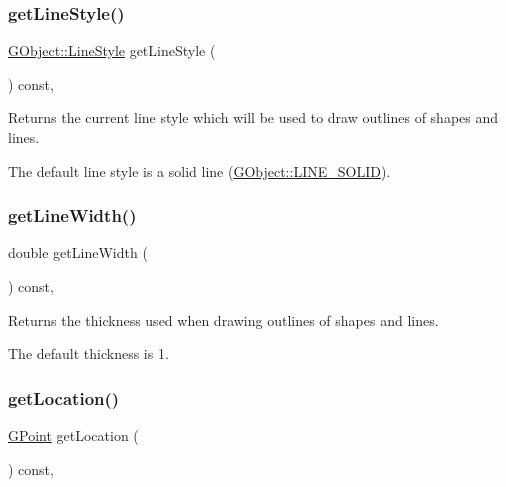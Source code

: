 \subsubsection{\texorpdfstring{get\+Line\+Style()}{getLineStyle()}}
{\footnotesize\ttfamily \mbox{\hyperlink{classGObject_a86e0f5648542856159bb40775c854aa7}{G\+Object\+::\+Line\+Style}} get\+Line\+Style (\begin{DoxyParamCaption}{ }\end{DoxyParamCaption}) const\hspace{0.3cm}{\ttfamily [virtual]}, {\ttfamily [inherited]}}



Returns the current line style which will be used to draw outlines of shapes and lines. 

The default line style is a solid line (\mbox{\hyperlink{classGObject_a86e0f5648542856159bb40775c854aa7a700c78bc2cd76acaab26651bf7b4941f}{G\+Object\+::\+L\+I\+N\+E\+\_\+\+S\+O\+L\+ID}}). \mbox{\label{classGDrawingSurface_a85ff266dc3eb63d9f2d8e5a4487fd3c0}} 
\subsubsection{\texorpdfstring{get\+Line\+Width()}{getLineWidth()}}
{\footnotesize\ttfamily double get\+Line\+Width (\begin{DoxyParamCaption}{ }\end{DoxyParamCaption}) const\hspace{0.3cm}{\ttfamily [virtual]}, {\ttfamily [inherited]}}



Returns the thickness used when drawing outlines of shapes and lines. 

The default thickness is 1. \mbox{\label{classGInteractor_a4f83802015511edeb63b892830812c11}} 
\subsubsection{\texorpdfstring{get\+Location()}{getLocation()}}
{\footnotesize\ttfamily \mbox{\hyperlink{classGPoint}{G\+Point}} get\+Location (\begin{DoxyParamCaption}{ }\end{DoxyParamCaption}) const\hspace{0.3cm}{\ttfamily [virtual]}, {\ttfamily [inherited]}}



